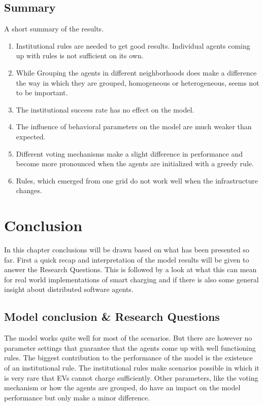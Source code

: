 \documentclass[a4paper]{article}
\begin{document}
\subsection{Summary}
A short summary of the results. 
\begin{enumerate}
 \item Institutional rules are needed to get good results. Individual agents coming up with rules is not 
sufficient on its own.
 \item While Grouping the agents in different neighborhoods does make a difference the way in which they are grouped, 
homogeneous or heterogeneous, seems not to be important. 
 \item The institutional success rate has no effect on the model.
 \item The influence of behavioral parameters on the model are much weaker than expected.
 \item Different voting mechanisms make a slight difference in performance and become more pronounced when the agents are initialized with a greedy rule.
 \item Rules, which emerged from one grid do not work well when the infrastructure changes.
\end{enumerate}

\clearpage

\section{Conclusion}
In this chapter conclusions will be drawn based on what has been presented so far. First a quick recap and interpretation of the
model results will be given to answer the Research Questions. 
This is followed by a look at what this can mean for real world implementations of smart charging and if there is also some 
general insight about distributed software agents. 
\subsection{Model conclusion \& Research Questions}
The model works quite well for most of the scenarios. But there are however no parameter settings that guarantee that the agents come up 
with well functioning rules. The biggest contribution to the performance of the model is the existence of an institutional rule. 
The institutional rules make scenarios possible in which it is very rare that EVs cannot charge sufficiently. Other parameters, 
like the voting mechanism or how the agents are grouped, do have an impact on the model performance but only make a minor difference. \\
\end{document}
